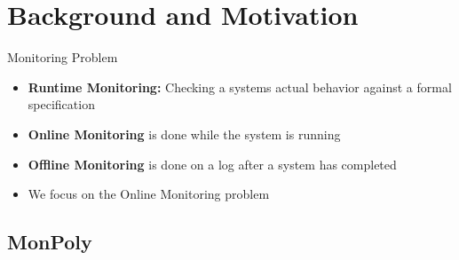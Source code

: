 \section{Background and Motivation}



\begin{frame}{Monitoring Problem}
    \begin{itemize}
        \item \textbf{Runtime Monitoring:} Checking a systems actual behavior against a formal specification
        \item \textbf{Online Monitoring} is done while the system is running
        \item \textbf{Offline Monitoring} is done on a log after a system has completed
        \item We focus on the Online Monitoring problem
    \end{itemize}
    
\end{frame}


\subsection{MonPoly}

